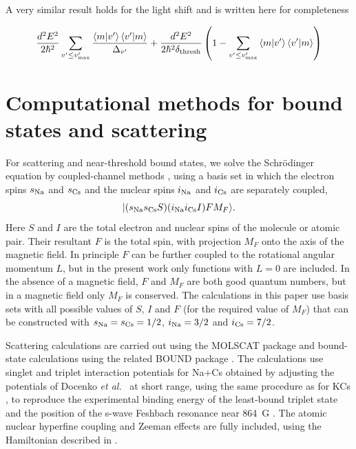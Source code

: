 \documentclass[aps,secnumarabic,amsmath,amssymb,10pt,superscriptaddress]{revtex4}
\begin{document}
A very similar result holds for the light shift and is written here for completeness

\begin{equation}
  \frac{d^2E^2}{2\hbar^2}\displaystyle\sum_{v' \leq v'_{\text{max}}} \frac{\braket{m|v'}\braket{v'|m}}{\Delta_{v'}} +  \frac{d^2E^2}{2\hbar^2\delta_{\text{thresh}}}\left(1 - \displaystyle\sum_{v' \leq v'_{\text{max}}}\braket{m|v'}\braket{v'|m}\right)
\end{equation}

\section{Computational methods for bound states and scattering}

For scattering and near-threshold bound states, we solve the Schr\"odinger equation by
coupled-channel methods \cite{HUTSON1994}, using a basis set in which the electron spins
$s_{\rm Na}$ and $s_{\rm Cs}$ and the nuclear spins $i_{\rm Na}$ and $i_{\rm Cs}$ are separately
coupled,
\begin{equation}
  | (s_{\rm Na} s_{\rm Cs} S)
  (i_{\rm Na} i_{\rm Cs} I) F M_F\rangle.
  \label{eqbassif}
\end{equation}
Here $S$ and $I$ are the total electron and nuclear spins of the molecule or atomic pair. Their
resultant $F$ is the total spin, with projection $M_F$ onto the axis of the magnetic field. In
principle $F$ can be further coupled to the rotational angular momentum $L$, but in the present
work only functions with $L=0$ are included. In the absence of a magnetic field, $F$ and $M_F$ are
both good quantum numbers, but in a magnetic field only $M_F$ is conserved. The calculations in
this paper use basis sets with all possible values of $S$, $I$ and $F$ (for the required value of
$M_F$) that can be constructed with $s_{\rm Na} = s_{\rm Cs} = 1/2$,
$i_{\rm Na} = 3/2$ and $i_{\rm Cs} = 7/2$.

Scattering calculations are carried out using the MOLSCAT package \cite{molscat:2019,
  mbf-github:2020} and bound-state calculations using the related BOUND package
\cite{bound+field:2019, mbf-github:2020}. The calculations use singlet and triplet interaction
potentials for Na+Cs obtained by adjusting the potentials of Docenko \emph{et al.}\
\cite{Docenko2006} at short range, using the same procedure as for KCs \cite{Groebner2017},
to reproduce the experimental binding energy of the least-bound triplet state \cite{Hood2019}
and the position of the s-wave Feshbach resonance near 864~G \cite{Zhang2020}. The atomic
nuclear hyperfine coupling and Zeeman effects are fully included, using the Hamiltonian described
in \cite{Hutson2008}.
\end{document}
